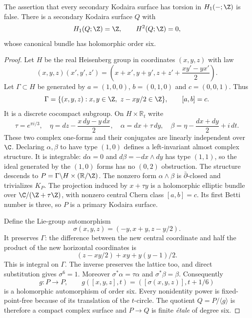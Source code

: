 \begin{proposition}
\label{st:C.3.2}
The assertion that every secondary Kodaira surface has torsion in
$H_1(-;\Z)$ is false. There is a secondary Kodaira surface $Q$ with
\[
H_1(Q;\Z)=\Z,\qquad H^2(Q;\Z)=0,
\]
whose canonical bundle has holomorphic order six.
\end{proposition}
\begin{proof}
Let $H$ be the real Heisenberg group in coordinates $(x,y,z)$ with law
\[
(x,y,z)(x',y',z')
=\left(x+x',y+y',z+z'+\frac{xy'-yx'}2\right).
\]
Let $\Gamma\subset H$ be generated by
$a=(1,0,0)$, $b=(0,1,0)$ and $c=(0,0,1)$. Thus
\[
\Gamma=\{(x,y,z):x,y\in\Z,\ z-xy/2\in\Z\},
\qquad [a,b]=c.
\]
It is a discrete cocompact subgroup. On $H\times\mathbb R_t$ write
\[
\tau=e^{\pi i/3},\quad
\eta=dz-\frac{x\,dy-y\,dx}{2},\quad
\alpha=dx+\tau\,dy,\quad
\beta=\eta-\frac{dx+dy}{2}+i\,dt.
\]
These two complex one-forms and their conjugates are linearly
independent over $\C$. Declaring $\alpha,\beta$ to have type $(1,0)$
defines a left-invariant almost complex structure. It is integrable:
$d\alpha=0$ and $d\beta=-dx\wedge dy$ has type $(1,1)$, so the
ideal generated by the $(1,0)$ forms has no $(0,2)$ obstruction.
The structure descends to
$P=\Gamma\backslash H\times(\mathbb R/\Z)$.
The nonzero form $\alpha\wedge\beta$ is $\bar\partial$-closed and
trivializes $K_P$. The projection induced by $x+\tau y$ is a
holomorphic elliptic bundle over $\C/(\Z+\tau\Z)$, with nonzero
central Chern class $[a,b]=c$. Its first Betti number is three, so
$P$ is a primary Kodaira surface.

Define the Lie-group automorphism
\[
\sigma(x,y,z)=(-y,x+y,z-y/2).
\]
It preserves $\Gamma$: the difference between the new central
coordinate and half the product of the new horizontal coordinates
is
\[
(z-xy/2)+xy+y(y-1)/2.
\]
This is integral on $\Gamma$. The inverse preserves the lattice too,
and direct substitution gives $\sigma^6=1$. Moreover
$\sigma^*\alpha=\tau\alpha$ and $\sigma^*\beta=\beta$.
Consequently
\[
g:P\longrightarrow P,\qquad
g([x,y,z],t)=([\sigma(x,y,z)],t+1/6)
\]
is a holomorphic automorphism of order six. Every nonidentity power
is fixed-point-free because of its translation of the $t$-circle.
The quotient $Q=P/\langle g\rangle$ is therefore a compact complex
surface and $P\to Q$ is finite \emph{\'etale} of degree six.


\end{proof}
